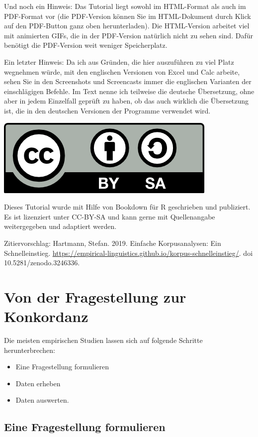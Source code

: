 \documentclass[]{article}
\providecommand{\tightlist}{%
  \setlength{\itemsep}{0pt}\setlength{\parskip}{0pt}}
\begin{document}
Und noch ein Hinweis: Das Tutorial liegt sowohl im HTML-Format als auch
im PDF-Format vor (die PDF-Version können Sie im HTML-Dokument durch
Klick auf den PDF-Button ganz oben herunterladen). Die HTML-Version
arbeitet viel mit animierten GIFs, die in der PDF-Version natürlich
nicht zu sehen sind. Dafür benötigt die PDF-Version weit weniger
Speicherplatz.

Ein letzter Hinweis: Da ich aus Gründen, die hier auszuführen zu viel
Platz wegnehmen würde, mit den englischen Versionen von Excel und Calc
arbeite, sehen Sie in den Screenshots und Screencasts immer die
englischen Varianten der einschlägigen Befehle. Im Text nenne ich
teilweise die deutsche Übersetzung, ohne aber in jedem Einzelfall
geprüft zu haben, ob das auch wirklich die Übersetzung ist, die in den
deutschen Versionen der Programme verwendet wird.

\begin{center}\includegraphics[width=0.3\linewidth,height=0.3\textheight]{docs/fig/by-sa} \end{center}

Dieses Tutorial wurde mit Hilfe von Bookdown für R geschrieben und
publiziert. Es ist lizenziert unter CC-BY-SA und kann gerne mit
Quellenangabe weitergegeben und adaptiert werden.

Zitiervorschlag: Hartmann, Stefan. 2019. Einfache Korpusanalysen: Ein
Schnelleinstieg.
\url{https://empirical-linguistics.github.io/korpus-schnelleinstieg/}.
doi 10.5281/zenodo.3246336.

\section{Von der Fragestellung zur
Konkordanz}\label{von-der-fragestellung-zur-konkordanz}

Die meisten empirischen Studien lassen sich auf folgende Schritte
herunterbrechen:

\begin{itemize}
\tightlist
\item
  Eine Fragestellung formulieren
\item
  Daten erheben
\item
  Daten auswerten.
\end{itemize}

\subsection{Eine Fragestellung
formulieren}\label{eine-fragestellung-formulieren}
\end{document}
